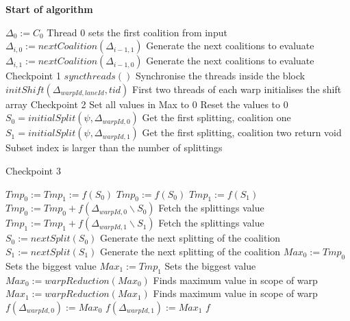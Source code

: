 \documentclass[a4paper, 12pt]{report}
\begin{document}
\textbf{Start of algorithm}
\begin{algorithmic}[1]
  \STATE $\Delta_0 := C_0$ \hfill Thread 0 sets the first coalition from input
    \STATE $\Delta_{i,0} := nextCoalition(\Delta_{i-1,1})$ \hfill Generate the next coalitions to evaluate
    \STATE $\Delta_{i,1} := nextCoalition(\Delta_{i-1,0})$ \hfill Generate the next coalitions to evaluate
  \ENDFOR \hfill Checkpoint 1
\ENDIF
\STATE $syncthreads()$ \hfill Synchronise the threads inside the block 
  \STATE $initShift(\Delta_{warpId,laneId},tid)$ \hfill First two threads of each warp initialises the shift array
\ENDIF
\hfill Checkpoint 2
  \STATE Set all values in Max to 0 \hfill Reset the values to 0
  \STATE $S_0 = initialSplit(\psi,\Delta_{warpId,0})$  \hfill Get the first splitting, coalition one
  \STATE $S_1 = initialSplit(\psi,\Delta_{warpId,1})$ \hfill  Get the first splitting, coalition two
  \STATE \algorithmicif{$\psi \geq \Psi$} \algorithmicthen\space return void \algorithmicendif \space \hfill Subset index is larger than the number of splittings
  
\hfill Checkpoint 3

      \STATE $Tmp_0 := Tmp_1 := f(S_0)$
    \ELSE
      \STATE $Tmp_0 := f(S_0)$
      \STATE $Tmp_1 := f(S_1)$
    \ENDIF
    \STATE $Tmp_0 := Tmp_0 + f(\Delta_{warpId,0}\backslash S_0)$ \hfill Fetch the splittings value
    \STATE $Tmp_1 := Tmp_1 + f(\Delta_{warpId,1}\backslash S_1)$ \hfill Fetch the splittings value
    \STATE $S_0 := nextSplit(S_0)$ \hfill Generate the next splitting of the coalition
    \STATE $S_1 := nextSplit(S_1)$ \hfill Generate the next splitting of the coalition
   \STATE {} \algorithmicthen\space $ Max_0 := Tmp_0$ \algorithmicendif \hfill Sets the biggest value 
  \STATE  {} \algorithmicthen\space $ Max_1 := Tmp_1$ \algorithmicendif \hfill Sets the biggest value 
\ENDFOR
\STATE $Max_0 := warpReduction(Max_0)$ \hfill Finds maximum value in scope of warp
\STATE $Max_1 := warpReduction(Max_1)$ \hfill Finds maximum value in scope of warp
\STATE  {} \algorithmicthen\space $f(\Delta_{warpId,0}) := Max_0$ \algorithmicendif 
\STATE  {} \algorithmicthen\space $f(\Delta_{warpId,1}) := Max_1$ \algorithmicendif 
\ENDIF
\RETURN $f$
\end{algorithmic}
\end{document}

